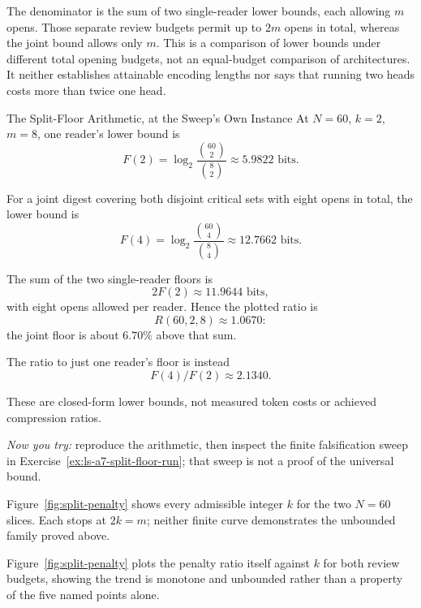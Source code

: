 \documentclass[11pt,a4paper]{article}
\theoremstyle{definition}
\theoremstyle{plain}
\begin{document}
The denominator is the sum of two single-reader lower bounds, each allowing
$m$ opens. Those separate review budgets permit up to $2m$ opens in total,
whereas the joint bound allows only $m$. This is a comparison of lower bounds
under different total opening budgets, not an equal-budget comparison of
architectures. It neither establishes attainable encoding lengths nor says
that running two heads costs more than twice one head.

\begin{pdexample}{The Split-Floor Arithmetic, at the Sweep's Own Instance}
\setlength{\parskip}{4pt plus 1pt}
At $N=60$, $k=2$, $m=8$, one reader's lower bound is
\[
F(2)=\log_2\!\frac{\binom{60}{2}}{\binom82}
\approx5.9822\text{ bits}.
\]

For a joint digest covering both disjoint critical sets with eight opens in
total, the lower bound is
\[
F(4)=\log_2\!\frac{\binom{60}{4}}{\binom84}
\approx12.7662\text{ bits}.
\]

The sum of the two single-reader floors is
\[
2F(2)\approx11.9644 \text{ bits},
\]
with eight opens allowed per reader. Hence the plotted ratio is
\[
R(60,2,8)\approx1.0670:
\]
the joint floor is about $6.70\%$ above that sum.

The ratio to just one reader's floor is instead
\[
F(4)/F(2)\approx2.1340.
\]

These are closed-form lower bounds, not measured token costs or achieved
compression ratios.

\emph{Now you try:} reproduce the arithmetic, then inspect
the finite falsification sweep in Exercise~\ref{ex:ls-a7-split-floor-run};
that sweep is not a proof of the universal bound.
\end{pdexample}

Figure~\ref{fig:split-penalty} shows every admissible integer $k$ for the
two $N=60$ slices. Each stops at $2k=m$; neither finite curve demonstrates
the unbounded family proved above.


Figure~\ref{fig:split-penalty} plots the penalty ratio itself against $k$
for both review budgets, showing the trend is monotone and unbounded rather
than a property of the five named points alone.
\end{document}
